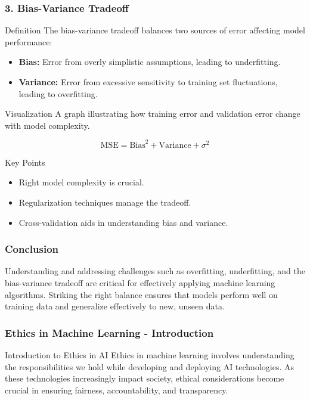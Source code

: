 \documentclass[aspectratio=169]{beamer}
\begin{document}
\begin{frame}[fragile]
  \frametitle{3. Bias-Variance Tradeoff}

  \begin{block}{Definition}
    The bias-variance tradeoff balances two sources of error affecting model performance:
  \end{block}

  \begin{itemize}
    \item \textbf{Bias:} Error from overly simplistic assumptions, leading to underfitting.
    \item \textbf{Variance:} Error from excessive sensitivity to training set fluctuations, leading to overfitting.
  \end{itemize}

  \begin{block}{Visualization}
    A graph illustrating how training error and validation error change with model complexity.
  \end{block}

  \begin{equation}
    \text{MSE} = \text{Bias}^2 + \text{Variance} + \sigma^2
  \end{equation}

  \begin{block}{Key Points}
    \begin{itemize}
      \item Right model complexity is crucial.
      \item Regularization techniques manage the tradeoff.
      \item Cross-validation aids in understanding bias and variance.
    \end{itemize}
  \end{block}
\end{frame}

\begin{frame}[fragile]
  \frametitle{Conclusion}

  Understanding and addressing challenges such as overfitting, underfitting, and the bias-variance tradeoff are critical for effectively applying machine learning algorithms. Striking the right balance ensures that models perform well on training data and generalize effectively to new, unseen data.
\end{frame}

\begin{frame}[fragile]
    \frametitle{Ethics in Machine Learning - Introduction}
    \begin{block}{Introduction to Ethics in AI}
        Ethics in machine learning involves understanding the responsibilities we hold while developing and deploying AI technologies. As these technologies increasingly impact society, ethical considerations become crucial in ensuring fairness, accountability, and transparency.
    \end{block}
\end{frame}
\end{document}

